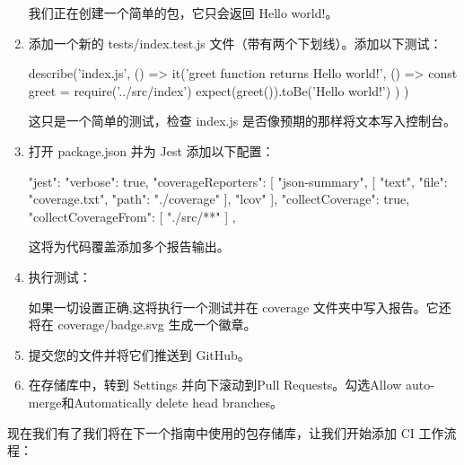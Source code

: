 \begin{enumerate}
我们正在创建一个简单的包，它只会返回 Hello world!。

\item 
添加一个新的 tests/index.test.js 文件（带有两个下划线）。添加以下测试：

\begin{shell}
describe('index.js', () => {
  it('greet function returns Hello world!', () => {
    const greet = require('../src/index')
    expect(greet()).toBe('Hello world!')
  })
})
\end{shell}

这只是一个简单的测试，检查 index.js 是否像预期的那样将文本写入控制台。

\item 
打开 package.json 并为 Jest 添加以下配置：

\begin{shell}
"jest": {
  "verbose": true,
  "coverageReporters": [
    "json-summary",
    [
      "text",
      {
        "file": "coverage.txt",
        "path": "./coverage"
      }
    ],
    "lcov"
  ],
  "collectCoverage": true,
  "collectCoverageFrom": [
    "./src/**"
  ]
},
\end{shell}

这将为代码覆盖添加多个报告输出。

\item 
执行测试： 


如果一切设置正确,这将执行一个测试并在 coverage 文件夹中写入报告。它还将在 coverage/badge.svg 生成一个徽章。

\item 
提交您的文件并将它们推送到 GitHub。

\item 
在存储库中，转到 Settings 并向下滚动到Pull Requests。勾选Allow auto-merge和Automatically delete head branches。
\end{enumerate}


现在我们有了我们将在下一个指南中使用的包存储库，让我们开始添加 CI 工作流程：

